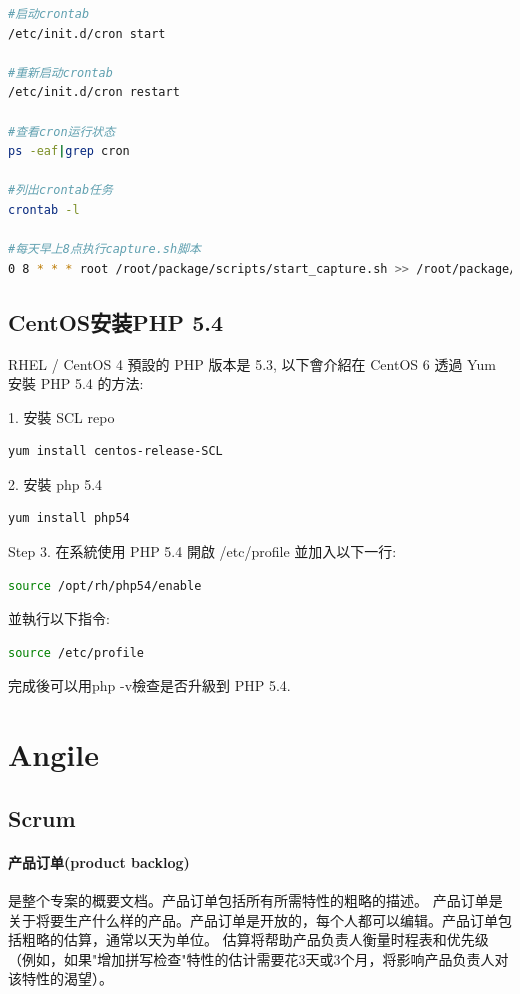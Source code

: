 \documentclass{book}
\begin{document}
\begin{lstlisting}[language=Bash]
#启动crontab
/etc/init.d/cron start

#重新启动crontab
/etc/init.d/cron restart

#查看cron运行状态
ps -eaf|grep cron

#列出crontab任务
crontab -l

#每天早上8点执行capture.sh脚本
0 8 * * * root /root/package/scripts/start_capture.sh >> /root/package/capture.log
\end{lstlisting}

\subsection{CentOS安装PHP 5.4}

RHEL / CentOS 4 預設的 PHP 版本是 5.3, 以下會介紹在 CentOS 6 透過 Yum 安裝 PHP 5.4 的方法:

1. 安裝 SCL repo

\begin{lstlisting}[language=Bash]
yum install centos-release-SCL
\end{lstlisting}


2. 安裝 php 5.4

\begin{lstlisting}[language=Bash]
yum install php54
\end{lstlisting}

Step 3. 在系統使用 PHP 5.4
開啟 /etc/profile 並加入以下一行:

\begin{lstlisting}[language=Bash]
source /opt/rh/php54/enable
\end{lstlisting}

並執行以下指令:

\begin{lstlisting}[language=Bash]
source /etc/profile
\end{lstlisting}

完成後可以用php -v檢查是否升級到 PHP 5.4.

\section{Angile}

\subsection{Scrum}

\paragraph{产品订单(product backlog)}是整个专案的概要文档。产品订单包括所有所需特性的粗略的描述。
产品订单是关于将要生产什么样的产品。产品订单是开放的，每个人都可以编辑。产品订单包括粗略的估算，通常以天为单位。
估算将帮助产品负责人衡量时程表和优先级（例如，如果"增加拼写检查"特性的估计需要花3天或3个月，将影响产品负责人对该特性的渴望）。
\end{document}
